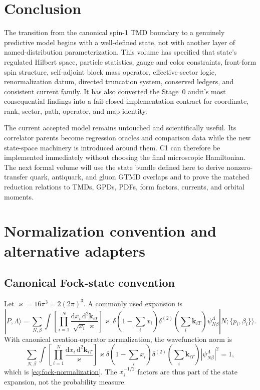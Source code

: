 \documentclass[11pt]{article}
\newcommand{\dd}{\mathrm{d}}
\newcommand{\vark}{\varkappa}
\begin{document}
\section{Conclusion}

The transition from the canonical spin-1 TMD boundary to a genuinely
predictive model begins with a well-defined state, not with another layer of
named-distribution parameterization.  This volume has specified that state's
regulated Hilbert space, particle statistics, gauge and color constraints,
front-form spin structure, self-adjoint block mass operator, effective-sector
logic, renormalization datum, directed truncation system, conserved ledgers,
and consistent current family.  It has also converted the Stage~0 audit's
most consequential findings into a fail-closed implementation contract for
coordinate, rank, sector, path, operator, and map identity.

The current accepted model remains untouched and scientifically useful.  Its
correlator parents become regression oracles and comparison data while the
new state-space machinery is introduced around them.  C1 can therefore be
implemented immediately without choosing the final microscopic Hamiltonian.
The next formal volume will use the state bundle defined here to derive
nonzero-transfer quark, antiquark, and gluon GTMD overlaps and to prove the
matched reduction relations to TMDs, GPDs, PDFs, form factors, currents, and
orbital moments.

\appendix

\section{Normalization convention and alternative adapters}
\label{app:normalization}

\subsection{Canonical Fock-state convention}

Let \(\vark=16\pi^3=2(2\pi)^3\).  A commonly used expansion is
\begin{equation}
 |P,\Lambda\rangle
 =\sum_{N,\beta}\int
 \left[\prod_{i=1}^{N}\frac{\dd x_i\,\dd^2\bm k_{iT}}
 {\sqrt{x_i}\,\vark}\right]
 \vark\,\delta\!\left(1-\sum_i x_i\right)
 \delta^{(2)}\!\left(\sum_i\bm k_{iT}\right)
 \psi_{N\beta}^{\Lambda}
 |N;\{p_i,\beta_i\}\rangle.
\label{eq:appendix-standard-expansion}
\end{equation}
With canonical creation-operator normalization, the wavefunction norm is
\begin{equation}
 \sum_{N,\beta}\int
 \left[\prod_{i=1}^{N}\frac{\dd x_i\,\dd^2\bm k_{iT}}
 {\vark}\right]
 \vark\delta\!\left(1-\sum_i x_i\right)
 \delta^{(2)}\!\left(\sum_i\bm k_{iT}\right)
 |\psi_{N\beta}^{\Lambda}|^2=1,
\label{eq:appendix-standard-norm}
\end{equation}
which is \cref{eq:fock-normalization}.  The \(x_i^{-1/2}\) factors are thus
part of the state expansion, not the probability measure.
\end{document}
